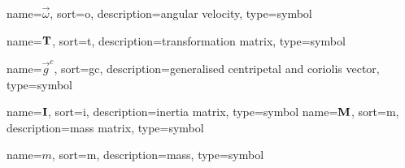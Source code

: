 
	{%
		name=\ensuremath{\vec{\omega}},
		sort=o,
		description=angular velocity,
		type=symbol
	}
	\newcommand{\avel}{\gls{sym:avel}}

	{%
		name=\ensuremath{\mat{T}},
		sort=t,
		description=transformation matrix,
		type=symbol
	}
	\newcommand{\transformationmat}{\gls{sym:transformationmat}}

	{%
		name=\ensuremath{\vec{g}^c},
		sort=gc,
		description=generalised centripetal and coriolis vector,
		type=symbol
	}
	\newcommand{\centripitalCoriolisVec}{\gls{sym:centripitalCoriolisVec}}

	{%
		name=\ensuremath{\mat{I}},
			sort=i,
			description=inertia matrix,
			type=symbol
		}
		\newcommand{\inertiamat}{\gls{sym:inertiamat}}
	{%
		name=\ensuremath{\mat{M}},
		sort=m,
		description=mass matrix,
		type=symbol
	}
	\newcommand{\massmat}{\gls{sym:massmat}}

	{%
		name=\ensuremath{m},
		sort=m,
		description=mass,
		type=symbol
	}
	\newcommand{\mass}{\gls{sym:mass}}

